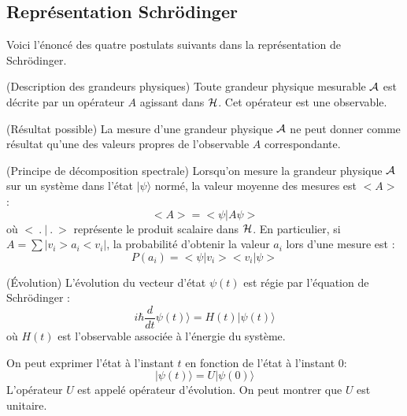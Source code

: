 \documentclass[12pt]{book}
\begin{document}
\subsection{Repr\'esentation Schr\"odinger}
Voici l'\'enonc\'e des quatre postulats suivants dans la
repr\'esentation de Schr\"odinger.
\begin{postulat}
(Description des grandeurs physiques) Toute grandeur physique
mesurable $\cal A$ est d\'ecrite par un 
op\'erateur $A$ agissant dans $\cal H$. Cet op\'erateur est une
observable.
\end{postulat}
\begin{postulat}
(R\'esultat possible)
La mesure d'une grandeur physique $\cal A$ ne peut donner comme
r\'esultat qu'une des valeurs propres de l'observable $A$
correspondante.
\end{postulat}
\begin{postulat}(Principe de d\'ecomposition spectrale)
Lorsqu'on mesure la grandeur physique $\cal A$ sur un syst\`eme dans
l'\'etat $|\psi \rangle $ norm\'e, la valeur moyenne des mesures est
$<A>$ :
\begin{equation}
<A>=<\psi|A\psi>
\end{equation}
o\`u $<\ .\ |\ .\ >$ repr\'esente le produit scalaire dans $\cal H$. 
En particulier, si $A=\sum |v_i>a_i<v_i|$, la probabilit\'e d'obtenir
la valeur $a_i$ lors d'une mesure est :
\begin{equation}
P(a_i)=<\psi|v_i><v_i|\psi>
\end{equation}
\end{postulat}
\begin{postulat}
(\'Evolution)
L'\'evolution du vecteur d'\'etat $\psi(t)$ est r\'egie par
l'\'equation de 
Schr\"odinger :
\begin{equation}
i\hbar \frac{d}{dt} \psi(t)\rangle =H(t)|\psi(t)\rangle 
\end{equation}
o\`u $H(t)$ est l'observable associ\'ee \`a l'\'energie du syst\`eme.
\end{postulat}
\begin{rem}
On peut exprimer l'\'etat \`a l'instant $t$ en fonction de l'\'etat
\`a l'instant $0$:
\begin{equation}
|\psi(t)\rangle=U|\psi(0)\rangle
\end{equation}
L'op\'erateur $U$ est appel\'e op\'erateur
d'\'evolution. On peut
montrer que $U$ est unitaire.
\end{rem}
\end{document}

